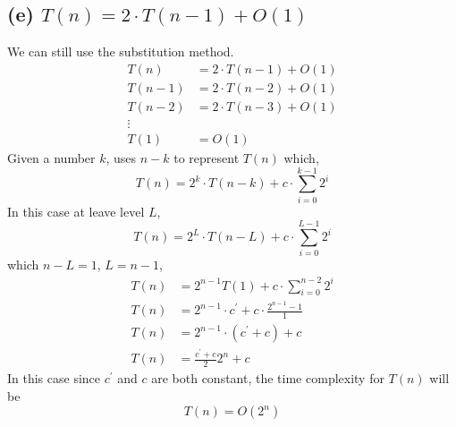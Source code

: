 \documentclass{article}
\begin{document}
\subsection*{(e) $T(n) = 2\cdot T(n-1) + O(1)$ }
We can still use the substitution method.
    \begin{align}
        T(n) &= 2\cdot T(n-1) + O(1) \nonumber \\
        T(n-1) &= 2\cdot T(n-2) + O(1) \nonumber \\
        T(n-2) &=  2\cdot T(n-3) + O(1) \nonumber \\
        \vdots \nonumber \\
        T(1) &= O(1) \nonumber
    \end{align}
Given a number $k$, uses $n-k$ to represent $T(n)$ which,
$$T(n) = 2^k \cdot T(n-k) + c \cdot \sum_{i=0}^{k-1}2^i$$
In this case at leave level $L$,
$$T(n) = 2^L \cdot T(n-L) + c\cdot \sum_{i = 0}^{L-1}2^i$$
which $n-L = 1$, $L = n-1$,
    \begin{align}
        T(n) &= 2^{n-1}T(1) + c\cdot \sum_{i=0}^{n-2}2^i \nonumber \\
        T(n) &= 2^{n-1} \cdot c^\prime  + c\cdot  \frac{2^{n-1} - 1}{1}\nonumber \\
        T(n) &= 2^{n-1} \cdot (c^\prime + c)  + c \nonumber \\
        T(n) &= \frac{c^\prime+c}{2} 2^{n} + c \nonumber
    \end{align}
In this case since $c^\prime$ and $c$ are both constant, the time complexity for $T(n)$ will be 
$$T(n) = O(2^n)$$
\end{document}
